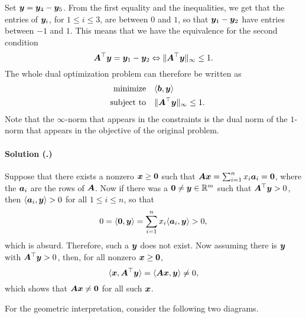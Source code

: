 \documentclass{article}
\newcounter{problemSheetNumber}
\newcounter{problems}
\renewcommand{\solution}[1]{\paragraph{Solution (\theproblemSheetNumber.\theproblems)}\addtocounter{problems}{1}\label{#1}}
\begin{document}
Set $\bm{y}=\bm{y}_4-\bm{y}_5$. From the first equality and the inequalities, we get that the entries of $\bm{y}_i$, for $1\leq i\leq 3$, are between $0$ and $1$, so that $\bm{y}_1-\bm{y}_2$ have entries between $-1$ and $1$. This means that we have the equivalence for the second condition
\begin{equation*}
 \bm{A}^{\top}\bm{y} = \bm{y}_1-\bm{y}_2 \Leftrightarrow \Vert {\bm{A}^{\top}\bm{y}}\Vert_\infty \leq 1. 
\end{equation*}
The whole dual optimization problem can therefore be written as
\begin{align*}
 \text{minimize}\quad & \langle {\bm{b}}, {\bm{y}} \rangle\\
 \quad\text{subject to}\quad & \Vert {\bm{A}^{\top}\bm{y}}\Vert_\infty\leq 1.
\end{align*}
Note that the $\infty$-norm that appears in the constraints is the dual norm of the $1$-norm that appears in the objective of the original problem.

\solution{pr:4} Suppose that there exists a nonzero $\bm{x}\geq \bm{0}$ such that $\bm{A}\bm{x}=\sum_{i=1}^n x_i\bm{a}_i=\bm{0}$, where the $\bm{a}_i$ are the rows of $\bm{A}$. Now if there was a $\bm{0}\neq \bm{y}\in \mathbb{R}^m$ such that $\bm{A}^{\top}\bm{y}>0$, then $\langle {\bm{a}_i}, {\bm{y}} \rangle>0$ for all $1\leq i\leq n$, so that
\begin{equation*}
 0 =\langle {\bm{0}}, {\bm{y}} \rangle = \sum_{i=1}^n x_i \langle {\bm{a}_i}, {\bm{y}} \rangle >0,
\end{equation*}
which is absurd. Therefore, such a $\bm{y}$ does not exist. Now assuming there is $\bm{y}$ with $\bm{A}^{\top}\bm{y}>0$, then, for all nonzero $\bm{x}\geq \bm{0}$,
\begin{equation*}
 \langle {\bm{x}}, {\bm{A}^{\top}\bm{y}} \rangle = \langle {\bm{A}\bm{x}}, {\bm{y}} \rangle \neq 0, 
\end{equation*}
which shows that $\bm{A}\bm{x}\neq \bm{0}$ for all such $\bm{x}$. 

For the geometric interpretation, consider the following two diagrams.
\end{document}
